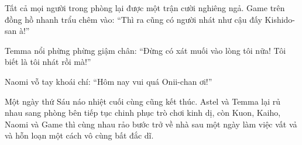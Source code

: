 \documentclass[../main.tex]{subfiles}
\begin{document}
Tất cả mọi người trong phòng lại được một trận cười nghiêng ngả. Game trên đồng hồ nhanh trẩu chêm vào: ``Thì ra cũng có người nhát như cậu đấy Kishido-san à!''

Temma nổi phừng phừng giậm chân: ``Đừng có xát muối vào lòng tôi nữa! Tôi biết là tôi nhát rồi mà!''

Naomi vỗ tay khoái chí: ``Hôm nay vui quá Onii-chan ơi!''

Một ngày thứ Sáu náo nhiệt cuối cùng cũng kết thúc. Astel và Temma lại rủ nhau sang phòng bên tiếp tục chinh phục trò chơi kinh dị, còn Kuon, Kaiho, Naomi và Game thì cùng nhau rảo bước trở về nhà sau một ngày làm việc vất vả và hỗn loạn một cách vô cùng bất đắc dĩ.
\end{document}
